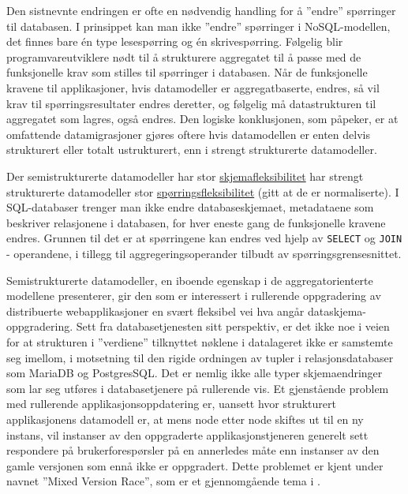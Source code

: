 Den sistnevnte endringen er ofte en nødvendig handling for å ''endre'' spørringer til databasen. I prinsippet kan man ikke ''endre'' spørringer i NoSQL-modellen, det finnes bare én type lesespørring og én skrivespørring. Følgelig blir programvareutviklere nødt til å strukturere aggregatet til å passe med de funksjonelle krav som stilles til spørringer i databasen. Når de funksjonelle kravene til applikasjoner, hvis datamodeller er aggregatbaserte, endres, så vil krav til spørringsresultater endres deretter, og følgelig må datastrukturen til aggregatet som lagres, også endres. Den logiske konklusjonen, som \cite{hauer2015} påpeker, er at omfattende datamigrasjoner gjøres oftere hvis datamodellen er enten delvis strukturert eller totalt ustrukturert, enn i strengt strukturerte datamodeller.

Der semistrukturerte datamodeller har stor \underline{skjemafleksibilitet} har strengt strukturerte datamodeller stor \underline{spørringsfleksibilitet} (gitt at de er normaliserte). I SQL-databaser trenger man ikke endre databaseskjemaet, metadataene som beskriver relasjonene i databasen, for hver eneste gang de funksjonelle kravene endres. Grunnen til det er at spørringene kan endres ved hjelp av \texttt{SELECT} og \texttt{JOIN} - operandene, i tillegg til aggregeringsoperander tilbudt av spørringsgrensesnittet.

Semistrukturerte datamodeller, en iboende egenskap i de aggregatorienterte modellene \cite{sadalage2013} presenterer, gir den som er interessert i rullerende oppgradering av distribuerte webapplikasjoner en svært fleksibel vei hva angår dataskjema-oppgradering. Sett fra databasetjenesten sitt perspektiv, er det ikke noe i veien for at strukturen i ''verdiene'' tilknyttet nøklene i datalageret ikke er samstemte seg imellom, i motsetning til den rigide ordningen av tupler i relasjonsdatabaser som MariaDB og PostgresSQL. Det er nemlig ikke alle typer skjemaendringer som lar seg utføres i databasetjenere på rullerende vis. Et gjenstående problem med rullerende applikasjonsoppdatering er, uansett hvor strukturert applikasjonens datamodell er, at mens node etter node skiftes ut til en ny instans, vil instanser av den oppgraderte applikasjonstjeneren generelt sett respondere på brukerforespørsler på en annerledes måte enn instanser av den gamle versjonen som ennå ikke er oppgradert. Dette problemet er kjent under navnet ''Mixed Version Race'', som er et gjennomgående tema i \cite{dumitras2010upgrade,dumitracs2009upgrades}.

